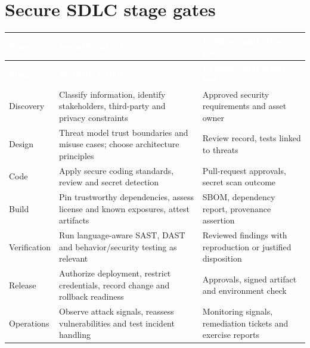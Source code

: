 \documentclass[11pt,letterpaper]{article}
\begin{document}
\section{Secure SDLC stage gates}
\small{}\begin{longtable}{>{\raggedright\arraybackslash}p{}>{\raggedright\arraybackslash}p{}>{\raggedright\arraybackslash}p{}}
\rowcolor{navy} \textcolor{white}{\textbf{Stage}} & \textcolor{white}{\textbf{Security activity}} & \textcolor{white}{\textbf{Evidence and release test}}\\
\endfirsthead
\rowcolor{navy} \textcolor{white}{\textbf{Stage}} & \textcolor{white}{\textbf{Security activity}} & \textcolor{white}{\textbf{Evidence and release test}}\\
\endhead
Discovery & Classify information, identify stakeholders, third-party and privacy constraints & Approved security requirements and asset owner\\
Design & Threat model trust boundaries and misuse cases; choose architecture principles & Review record, tests linked to threats\\
Code & Apply secure coding standards, review and secret detection & Pull-request approvals, secret scan outcome\\
Build & Pin trustworthy dependencies, assess license and known exposures, attest artifacts & SBOM, dependency report, provenance assertion\\
Verification & Run language-aware SAST, DAST and behavior/security testing as relevant & Reviewed findings with reproduction or justified disposition\\
Release & Authorize deployment, restrict credentials, record change and rollback readiness & Approvals, signed artifact and environment check\\
Operations & Observe attack signals, reassess vulnerabilities and test incident handling & Monitoring signals, remediation tickets and exercise reports\\
\end{longtable}\normalsize
\end{document}
